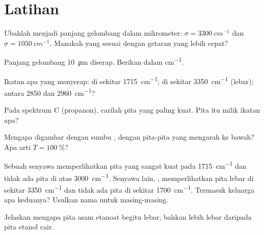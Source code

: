 \section{Latihan}

\begin{exercise}[$\star$]\label{exo:g11:infrared:1}
Ubahlah menjadi panjang gelombang dalam mikrometer:
$\sigma = \qty{3300}{cm^{-1}}$ dan $\sigma = \qty{1050}{cm^{-1}}$.
Manakah yang sesuai dengan getaran yang lebih cepat?
\end{exercise}

\begin{exercise}[$\star$]\label{exo:g11:infrared:2}
Panjang gelombang \qty{10}{\micro m} diserap. Berikan  dalam \si{cm^{-1}}.
\end{exercise}

\begin{exercise}[$\star$]\label{exo:g11:infrared:3}
Ikatan apa yang menyerap: di sekitar \qty{1715}{cm^{-1}}; di sekitar
\qty{3350}{cm^{-1}} (lebar); antara 2850 dan \qty{2960}{cm^{-1}}?
\end{exercise}

\begin{exercise}[$\star$]\label{exo:g11:infrared:4}
Pada spektrum C (propanon), carilah pita yang paling kuat. Pita itu
milik ikatan apa?
\end{exercise}

\begin{exercise}[$\star$]\label{exo:g11:infrared:5}
Mengapa  digambar dengan sumbu , dengan
pita-pita yang mengarah ke bawah? Apa arti $T = \qty{100}{\percent}$?
\end{exercise}

\begin{exercise}[$\star\star$]\label{exo:g11:infrared:6}
Sebuah senyawa  memperlihatkan pita yang sangat kuat pada
\qty{1715}{cm^{-1}} dan tidak ada pita di atas \qty{3000}{cm^{-1}}.
Senyawa lain, , memperlihatkan pita lebar di sekitar
\qty{3350}{cm^{-1}} dan tidak ada pita di sekitar \qty{1700}{cm^{-1}}.
Termasuk keluarga apa keduanya? Usulkan nama untuk masing-masing.
\end{exercise}

\begin{exercise}[$\star\star$]\label{exo:g11:infrared:7}
Jelaskan mengapa pita  asam etanoat begitu lebar, bahkan lebih
lebar daripada pita etanol cair.
\end{exercise}

